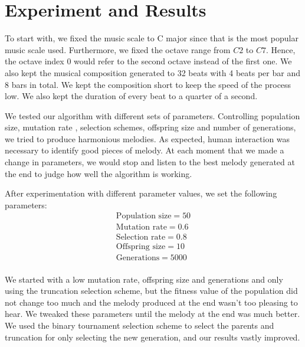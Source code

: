 \documentclass[conference]{IEEEtran}
\begin{document}
\section{Experiment and Results}
To start with, we fixed the music scale to C major since that is the most popular music scale used. Furthermore, we fixed the octave range from $C2$ to $C7$. Hence, the octave index 0 would refer to the second octave instead of the first one. We also kept the musical composition generated to 32 beats with 4 beats per bar and 8 bars in total. We kept the composition short to keep the speed of the process low. We also kept the duration of every beat to a quarter of a second.

We tested our algorithm with different sets of parameters. Controlling population size, mutation rate , selection schemes, offspring size and number of generations, we tried to produce harmonious melodies. As expected, human interaction was necessary to identify good pieces of melody. At each moment that we made a change in parameters, we would stop and listen to the best melody generated at the end to judge how well the algorithm is working.

After experimentation with different parameter values, we set the following parameters:
\begin{align*}
\text{Population size}=50\\
\text{Mutation rate} = 0.6\\
\text{Selection rate} = 0.8\\
\text{Offspring size}= 10\\
\text{Generations}= 5000\\
\end{align*}

We started with a low mutation rate, offspring size and generations and only using the truncation selection scheme, but the fitness value of the population did not change too much and the melody produced at the end wasn't too pleasing to hear. We tweaked these parameters until the melody at the end was much better. We used the binary tournament selection scheme to select the parents and truncation for only selecting the new generation, and our results vastly improved.
\end{document}

